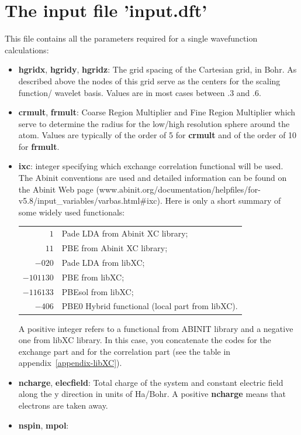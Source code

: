 \documentclass[a4paper,11pt]{report}
\begin{document}
\section{The input file 'input.dft'}
This file contains all the parameters required for a single wavefunction calculations:
\begin{itemize}
\item {\bf hgridx}, {\bf hgridy}, {\bf hgridz}: The grid spacing of the Cartesian grid, in Bohr. As 
       described above the nodes of this grid serve as the centers for the scaling function/ wavelet basis. 
       Values are in most cases between $.3$ and $.6$.

\item {\bf crmult}, {\bf frmult}: Coarse Region Multiplier and Fine Region Multiplier which serve to determine the radius
      for the low/high resolution sphere around the atom. 
      Values are typically of the order of 5 for {\bf crmult} and of the order of 10 for  {\bf frmult}.
\item {\bf ixc}: integer specifying which exchange correlation functional will be used. The Abinit conventions are 
      used and detailed information can be found on the Abinit Web page 
      (www.abinit.org/documentation/helpfiles/for-v5.8/in\-put\_variables/varbas.html\#ixc). 
      Here is only a short summary of some wide\-ly used functionals:\\
      \begin{tabular}{rl}
      {$1$}       & Pade LDA from Abinit XC library;\\
      {$11$}      & PBE from Abinit XC library;\\
      {$-020$}    & Pade LDA from libXC;\\
      {$-101130$} & PBE from libXC;\\
      {$-116133$} & PBEsol from libXC; \\ 
      {$-406$}    & PBE0 Hybrid functional (local part from libXC).
      \end{tabular}
      A positive integer refers to a functional from ABINIT library and a negative one from libXC
      library. In this case, you concatenate the codes for the exchange part and for the correlation part
      (see the table in appendix~\ref{appendix-libXC}).
\item {\bf ncharge}, {\bf elecfield}: Total charge of the system and constant electric field along the y direction in units of Ha/Bohr. 
      A positive {\bf ncharge} means that electrons are taken away.
\item {\bf nspin}, {\bf mpol}: 

\end{itemize}
\end{document}
